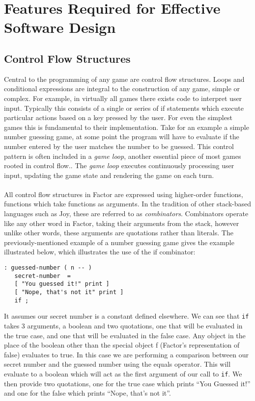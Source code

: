 \documentclass{sig-alternate}
\begin{document}
\section{Features Required for Effective Software Design} 
\subsection{Control Flow Structures}
Central to the programming of any game are control flow structures. 
 Loops and conditional expressions are integral to the construction of any game, 
 simple or complex. For example, in virtually all games there exists code to interpret 
 user input. Typically this consists of a single or  series of if statements which execute 
 particular actions based on a key pressed by the user.\cite{GameProgramming} For even the simplest games this
 is fundamental to their implementation. Take for an example a simple number guessing game, at 
  some point the program will have to evaluate if the number entered by the user matches the 
  number to be guessed. This control pattern is often included in a \textit{game loop}, another essential 
  piece of most games rooted in control flow.\cite{GameProgramming}. The \textit{game loop} executes continuously processing 
  user input, updating the game state and rendering the game on each turn.\cite{GameProgramming}
\\\\
All control flow structures in Factor are expressed using higher-order functions, functions which take
 functions as arguments. In the tradition of other stack-based languages such as Joy, these are referred
  to as \textit{combinators}. Combinators operate like any other word in Factor, taking their arguments from the 
  stack, however unlike other words, these arguments are quotations rather than literals.\cite{FactorArticle} The previously-mentioned example of a number guessing game gives the example illustrated below, which illustrates
    the use of the if combinator:    
    \begin{verbatim}
: guessed-number ( n -- ) 
   secret-number  = 
   [ "You guessed it!" print ] 
   [ "Nope, that's not it" print ] 
   if ; 
\end{verbatim} 
        It assumes our secret number is a constant defined elsewhere. We can see
     that \texttt{if} takes 3 arguments, a boolean and two quotations, one that will be evaluated in the true case, and one that will be evaluated in the false case. Any object in the place of the boolean other than the special object f (Factor's representation of false) evaluates to true\cite{ControlFlow}. In this case we are performing a comparison between our secret number and the guessed number using the equals operator. This will evaluate to a boolean which will act as the first argument of our call to \texttt{if}. We then provide two quotations, one for the true case which prints ``You Guessed it!'' and one for the false which prints ``Nope, that's not it''.
\end{document}
